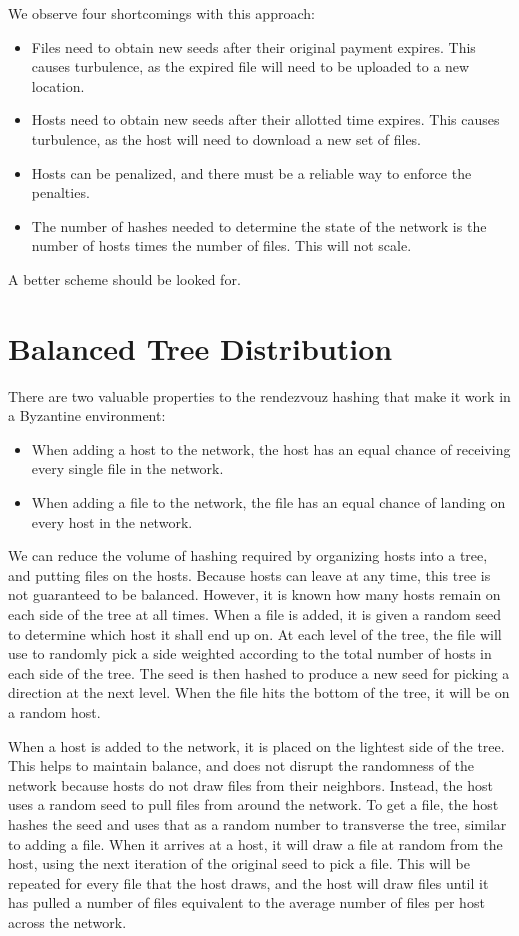 \documentclass[twocolumn]{article}
\begin{document}
We observe four shortcomings with this approach:
\begin{itemize}
	\item Files need to obtain new seeds after their original payment expires. This causes turbulence, as the expired file will need to be uploaded to a new location.
	\item Hosts need to obtain new seeds after their allotted time expires. This causes turbulence, as the host will need to download a new set of files.
	\item Hosts can be penalized, and there must be a reliable way to enforce the penalties.
	\item The number of hashes needed to determine the state of the network is the number of hosts times the number of files. This will not scale.
\end{itemize}
A better scheme should be looked for.

\section{Balanced Tree Distribution}
There are two valuable properties to the rendezvouz hashing that make it work in a Byzantine environment:
\begin{itemize}
	\item When adding a host to the network, the host has an equal chance of receiving every single file in the network.
	\item When adding a file to the network, the file has an equal chance of landing on every host in the network.
\end{itemize}
We can reduce the volume of hashing required by organizing hosts into a tree, and putting files on the hosts.
Because hosts can leave at any time, this tree is not guaranteed to be balanced.
However, it is known how many hosts remain on each side of the tree at all times.
When a file is added, it is given a random seed to determine which host it shall end up on.
At each level of the tree, the file will use to randomly pick a side weighted according to the total number of hosts in each side of the tree.
The seed is then hashed to produce a new seed for picking a direction at the next level.
When the file hits the bottom of the tree, it will be on a random host.

When a host is added to the network, it is placed on the lightest side of the tree.
This helps to maintain balance, and does not disrupt the randomness of the network because hosts do not draw files from their neighbors.
Instead, the host uses a random seed to pull files from around the network.
To get a file, the host hashes the seed and uses that as a random number to transverse the tree, similar to adding a file.
When it arrives at a host, it will draw a file at random from the host, using the next iteration of the original seed to pick a file.
This will be repeated for every file that the host draws, and the host will draw files until it has pulled a number of files equivalent to the average number of files per host across the network.
\end{document}
